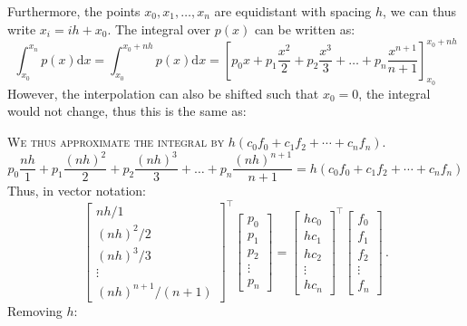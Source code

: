 \documentclass{book}
\begin{document}
Furthermore, the points $x_0, x_1, \dots, x_n$ are equidistant with spacing $h$, we can thus write $x_i=ih+x_0$. The integral over $p(x)$ can be written as:
\begin{equation}
    \int_{x_0}^{x_n} p(x) \mathrm d x =
    \int_{x_0}^{x_0+nh} p(x) \mathrm d x =
    \left[ p_0 x + p_1 \frac{x^2}{2} + p_2 \frac{x^3}{3} + \dots + p_n \frac{x^{n+1}}{n+1} \right]_{x_0}^{x_0+nh} \nonumber
\end{equation}
However, the interpolation can also be shifted such that $x_0 = 0$, the integral would not change, thus this is the same as:

\textsc{We thus approximate the integral by $h(c_0f_0+c_1f_2+\cdots+c_nf_n)$.}
\begin{equation}
    p_0 \frac{nh}{1} + p_1 \frac{(nh)^2}{2} + p_2 \frac{(nh)^3}{3} + \dots + p_n \frac{(nh)^{n+1}}{n+1} = h(c_0 f_0 + c_1 f_2 + \cdots + c_n f_n) \nonumber
\end{equation}
Thus, in vector notation:
\begin{equation}
    \begin{bmatrix}
        nh/1\\
        (nh)^2/2\\
        (nh)^3/3\\
        \vdots \\
        (nh)^{n+1}/(n+1)
    \end{bmatrix}^\top
    \begin{bmatrix}
        p_0\\
        p_1\\
        p_2\\
        \vdots \\
        p_n
    \end{bmatrix}
    =
    \begin{bmatrix}
        hc_0 \\
        hc_1 \\
        hc_2 \\
        \vdots \\
        hc_n
    \end{bmatrix}^\top
    \begin{bmatrix}
        f_0 \\
        f_1 \\
        f_2 \\
        \vdots \\
        f_n
    \end{bmatrix} \,. \nonumber
\end{equation}
Removing $h$:
\end{document}

